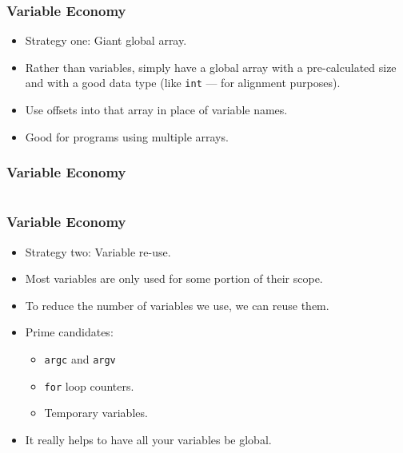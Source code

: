 \documentclass[handout,xcolor]{beamer}
\begin{document}
\begin{frame}
	\frametitle{Variable Economy}
	\pause
	
	\begin{itemize}
		\item Strategy one: \pause Giant global array.
		\pause
		
		\item Rather than variables, simply have a global array with a pre-calculated size and with a good data type \pause (like \texttt{int} --- for alignment purposes).
		\pause
		
		\item Use offsets into that array in place of variable names.
		\pause
		
		\item Good for programs using multiple arrays.
	\end{itemize}
\end{frame}

\begin{frame}
	\frametitle{Variable Economy}
	\pause
	
	\begin{columns}
		\begin{column}{0.45\textwidth}
			\centering
			
		\end{column}
		\pause
		\begin{column}{0.45\textwidth}
			\centering
			
		\end{column}
	\end{columns}
\end{frame}

\begin{frame}
	\frametitle{Variable Economy}
	\pause
	
	\begin{itemize}
		\item Strategy two: \pause Variable re-use.
		\pause
		
		\item Most variables are only used for some portion of their scope.
		\pause
		
		\item To reduce the number of variables we use, we can reuse them.
		\pause
		
		\item Prime candidates:
		\pause
		\begin{itemize}
			\item \texttt{argc} and \texttt{argv}
			\pause
			
			\item \texttt{for} loop counters.
			\pause
			
			\item Temporary variables.
		\end{itemize}
		\pause
		
		\item It really helps to have all your variables be global.
	\end{itemize}
\end{frame}
\end{document}
